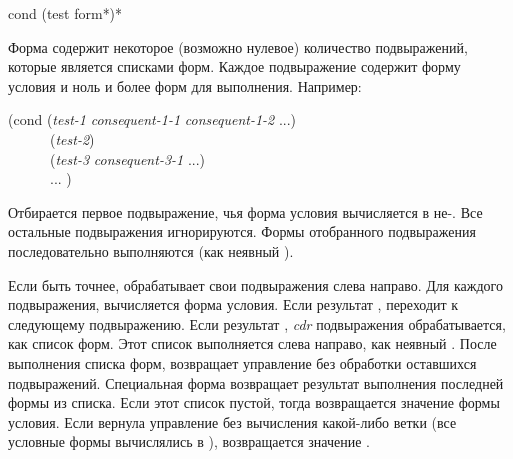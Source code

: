 \begin{defmac}
cond {(test {form}*)}*

Форма  содержит некоторое (возможно нулевое) количество подвыражений,
которые является списками форм.
Каждое подвыражение содержит форму условия и ноль и более форм для выполнения.
Например:
\begin{lisp}
(cond (\emph{test-1} \emph{consequent-1-1} \emph{consequent-1-2} ...) \\
~~~~~~(\emph{test-2}) \\
~~~~~~(\emph{test-3} \emph{consequent-3-1} ...) \\
~~~~~~... )
\end{lisp}

Отбирается первое подвыражение, чья форма условия вычисляется в не-{\false}. Все
остальные подвыражения игнорируются. Формы отобранного подвыражения
последовательно выполняются (как неявный ).

Если быть точнее,  обрабатывает свои подвыражения слева направо. Для
каждого подвыражения, вычисляется форма условия. Если результат {\false},
 переходит к следующему подвыражению. Если результат {\true},
\emph{cdr} подвыражения обрабатывается, как список форм. Этот список выполняется
слева направо, как неявный .
После выполнения списка форм,  возвращает управление без обработки
оставшихся подвыражений.
Специальная форма  возвращает результат выполнения последней формы из
списка. Если этот список пустой, тогда возвращается значение формы условия.
Если  вернула управление без вычисления какой-либо ветки (все условные
формы вычислялись в {\false}), возвращается значение {\false}.


\end{defmac}
